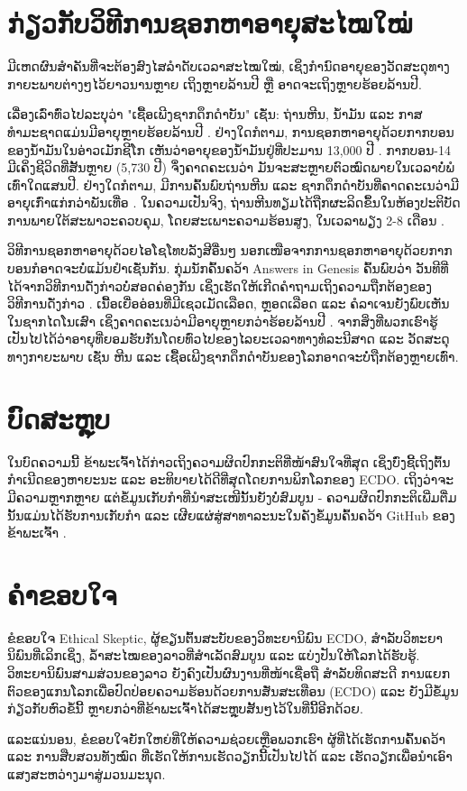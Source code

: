 \documentclass[10pt,twocolumn,letterpaper]{article}
\begin{document}
\section{ກ່ຽວກັບວິທີການຊອກຫາອາຍຸສະໄໝໃໝ່}

ມີເຫດຜົນສຳຄັນທີ່ຈະຕ້ອງສົງໄສລຳດັບເວລາສະໄໝໃໝ່, ເຊິ່ງກຳນົດອາຍຸຂອງວັດສະດຸທາງກາຍະພາບຕ່າງໆໄວ້ຍາວນານຫຼາຍ ເຖິງຫຼາຍລ້ານປີ ຫຼື ອາດຈະເຖິງຫຼາຍຮ້ອຍລ້ານປີ.

ເລື່ອງເລົ່າທົ່ວໄປລະບຸວ່າ "ເຊື້ອເພີງຊາກດຶກດຳບັນ" ເຊັ່ນ: ຖ່ານຫີນ, ນ້ຳມັນ ແລະ ກາສທຳມະຊາດແມ່ນມີອາຍຸຫຼາຍຮ້ອຍລ້ານປີ \cite{104}. ຢ່າງໃດກໍຕາມ, ການຊອກຫາອາຍຸດ້ວຍກາກບອນຂອງນ້ຳມັນໃນອ່າວເມັກຊີໂກ ເຫັນວ່າອາຍຸຂອງນ້ຳມັນຢູ່ທີ່ປະມານ 13,000 ປີ \cite{105}. ກາກບອນ-14 ມີເຄິ່ງຊີວິດທີ່ສັ້ນຫຼາຍ (5,730 ປີ) ຈຶ່ງຄາດຄະເນວ່າ ມັນຈະສະຫຼາຍຕົວໝົດພາຍໃນເວລາບໍ່ພໍເທົ່າໃດແສນປີ. ຢ່າງໃດກໍຕາມ, ມີການຄົ້ນພົບຖ່ານຫີນ ແລະ ຊາກດຶກດຳບັນທີ່ຄາດຄະເນວ່າມີອາຍຸເກົ່າແກ່ກວ່າພັນເທື່ອ \cite{106}. ໃນຄວາມເປັນຈິງ, ຖ່ານຫີນທຽມໄດ້ຖືກຜະລິດຂຶ້ນໃນຫ້ອງປະຕິບັດການພາຍໃຕ້ສະພາວະຄວບຄຸມ, ໂດຍສະເພາະຄວາມຮ້ອນສູງ, ໃນເວລາພຽງ 2-8 ເດືອນ \cite{107}.

ວິທີການຊອກຫາອາຍຸດ້ວຍໄອໂຊໂທບລັງສີອື່ນໆ ນອກເໜືອຈາກການຊອກຫາອາຍຸດ້ວຍກາກບອນກໍອາດຈະບໍ່ແມ້ນຢຳເຊັ່ນກັນ. ກຸ່ມນັກຄົ້ນຄວ້າ Answers in Genesis ຄົ້ນພົບວ່າ ວັນທີທີ່ໄດ້ຈາກວິທີການດັ່ງກ່າວບໍ່ສອດຄ່ອງກັນ ເຊິ່ງເຮັດໃຫ້ເກີດຄຳຖາມເຖິງຄວາມຖືກຕ້ອງຂອງວິທີການດັ່ງກ່າວ \cite{108}. ເນື້ອເຍື່ອອ່ອນທີ່ມີເຊວເມັດເລືອດ, ຫຼອດເລືອດ ແລະ ຄໍລາເຈນຍັງພົບເຫັນໃນຊາກໄດໂນເສົາ ເຊິ່ງຄາດຄະເນວ່າມີອາຍຸຫຼາຍກວ່າຮ້ອຍລ້ານປີ \cite{109,110}. ຈາກສິ່ງທີ່ພວກເຮົາຮູ້ ເປັນໄປໄດ້ວ່າອາຍຸທີ່ຍອມຮັບກັນໂດຍທົ່ວໄປຂອງໄລຍະເວລາທາງທໍລະນີສາດ ແລະ ວັດສະດຸທາງກາຍະພາບ ເຊັ່ນ ຫີນ ແລະ ເຊື້ອເພີງຊາກດຶກດຳບັນຂອງໂລກອາດຈະບໍ່ຖືກຕ້ອງຫຼາຍເທົ່າ.

\section{ບົດສະຫຼຸບ}

ໃນບົດຄວາມນີ້ ຂ້າພະເຈົ້າໄດ້ກ່າວເຖິງຄວາມຜິດປົກກະຕິທີ່ໜ້າສົນໃຈທີ່ສຸດ ເຊິ່ງບົ່ງຊີ້ເຖິງຕົ້ນກຳເນີດຂອງຫາຍະນະ ແລະ ອະທິບາຍໄດ້ດີທີ່ສຸດໂດຍການພິກໂລກຂອງ ECDO. ເຖິງວ່າຈະມີຄວາມຫຼາກຫຼາຍ ແຕ່ຂໍ້ມູນເກັບກຳທີ່ນຳສະເໜີນັ້ນຍັງບໍ່ສົມບູນ - ຄວາມຜິດປົກກະຕິເພີ່ມຕື່ມນັ້ນແມ່ນໄດ້ຮັບການເກັບກຳ ແລະ ເຜີຍແຜ່ສູ່ສາທາລະນະໃນຄັງຂໍ້ມູນຄົ້ນຄວ້າ GitHub ຂອງຂ້າພະເຈົ້າ \cite{2}.

\section{ຄຳຂອບໃຈ}

ຂໍຂອບໃຈ Ethical Skeptic, ຜູ້ຂຽນຕົ້ນສະບັບຂອງວິທະຍານິພົນ ECDO, ສຳລັບວິທະຍານິພົນທີ່ເລິກເຊິ່ງ, ລ້ຳສະໄໝຂອງລາວທີ່ສຳເລັດສົມບູນ ແລະ ແບ່ງປັນໃຫ້ໂລກໄດ້ຮັບຮູ້. ວິທະຍານິພົນສາມສ່ວນຂອງລາວ \cite{1} ຍັງຄົງເປັນຜົນງານທີ່ໜ້າເຊື່ອຖື ສຳລັບທິດສະດີ ການແຍກຕົວຂອງແກນໂລກເພື່ອປົດປ່ອຍຄວາມຮ້ອນດ້ວຍການສັ່ນສະເທືອນ (ECDO) ແລະ ຍັງມີຂໍ້ມູນກ່ຽວກັບຫົວຂໍ້ນີ້ ຫຼາຍກວ່າທີ່ຂ້າພະເຈົ້າໄດ້ສະຫຼຸບສັ້ນໆໄວ້ໃນທີ່ນີ້ອີກດ້ວຍ.

ແລະແນ່ນອນ, ຂໍຂອບໃຈຍັກໃຫຍ່ທີ່ໃຫ້ຄວາມຊ່ວຍເຫຼືອພວກເຮົາ ຜູ້ທີ່ໄດ້ເຮັດການຄົ້ນຄວ້າ ແລະ ການສືບສວນທັງໝົດ ທີ່ເຮັດໃຫ້ການເຮັດວຽກນີ້ເປັນໄປໄດ້ ແລະ ເຮັດວຽກເພື່ອນຳເອົາແສງສະຫວ່າງມາສູ່ມວນມະນຸດ.

\clearpage
\twocolumn

{\small


}
\end{document}
